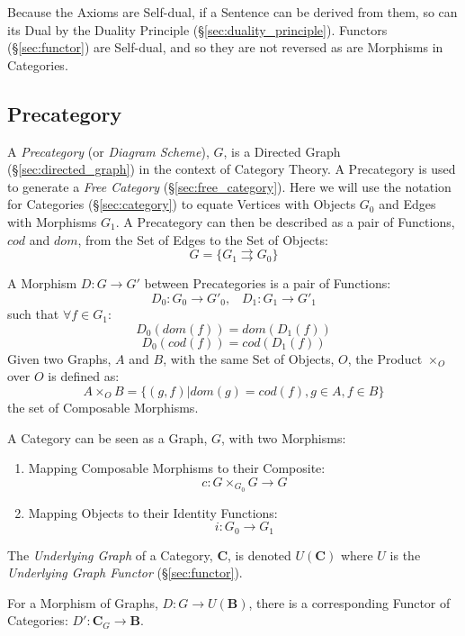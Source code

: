 Because the Axioms are Self-dual, if a Sentence can be derived from
them, so can its Dual by the Duality Principle
(\S\ref{sec:duality_principle}). Functors (\S\ref{sec:functor}) are
Self-dual, and so they are not reversed as are Morphisms in
Categories.



\subsection{Precategory}\label{sec:precategory}

A \emph{Precategory} (or \emph{Diagram Scheme}), $G$, is a Directed
Graph (\S\ref{sec:directed_graph}) in the context of Category
Theory. A Precategory is used to generate a \emph{Free Category}
(\S\ref{sec:free_category}). Here we will use the notation for
Categories (\S\ref{sec:category}) to equate Vertices with
Objects $G_0$ and Edges with Morphisms $G_1$. A Precategory can then
be described as a pair of Functions, $cod$ and $dom$, from the Set of
Edges to the Set of Objects:
\[
  G = \{G_1 \rightrightarrows G_0\}
\]

A Morphism $D : G \rightarrow G'$ between Precategories is a pair of
Functions:
\[
  D_0 : G_0 \rightarrow G'_0, \;\;\; D_1 : G_1 \rightarrow G'_1
\]
such that $\forall f \in G_1$:
\[
  D_0(dom(f)) = dom(D_1(f))
\]\[
  D_0(cod(f)) = cod(D_1(f))
\]
Given two Graphs, $A$ and $B$, with the same Set of Objects, $O$, the
Product $\times_O$ over $O$ is defined as:
\[
  A \times_O B = \{ (g,f) | dom(g) = cod(f), g \in A, f \in B \}
\]
the set of Composable Morphisms.

A Category can be seen as a Graph, $G$, with two Morphisms:
\begin{enumerate}
  \item Mapping Composable Morphisms to their Composite:
    \[c : G \times_{G_0} G \rightarrow G\]
  \item Mapping Objects to their Identity Functions:
    \[i: G_0 \rightarrow G_1\]
\end{enumerate}
The \emph{Underlying Graph} of a Category, $\mathbf{C}$, is denoted
$U(\mathbf{C})$ where $U$ is the \emph{Underlying Graph Functor}
(\S\ref{sec:functor}).

For a Morphism of Graphs, $D : G \rightarrow U(\mathbf{B})$, there is
a corresponding Functor of Categories: $D' : \mathbf{C}_G \rightarrow
\mathbf{B}$.

